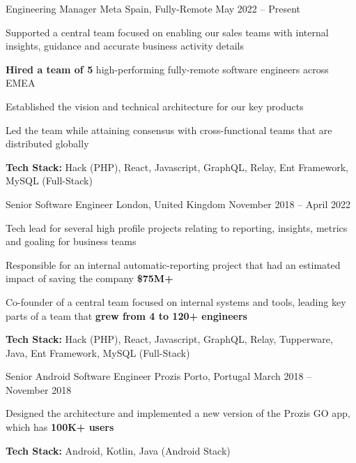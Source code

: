 \documentclass[]{awesome-cv}
\begin{document}
	
\vspace{-8mm}
\begin{cventries}

\vspace{-2mm}

\cventry
	{Engineering Manager}
	{Meta}
	{Spain, Fully-Remote}
	{May 2022 – Present}
	{\begin{cvitems}
		\item {Supported a central team focused on enabling our sales teams with internal insights, guidance and accurate business activity details}
		\item {\textbf{Hired a team of 5} high-performing fully-remote software engineers across EMEA}
		\item {Established the vision and technical architecture for our key products}
		\item {Led the team while attaining consensus with cross-functional teams that are distributed globally}
		\item {\textbf{Tech Stack:} Hack (PHP), React, Javascript, GraphQL, Relay, Ent Framework, MySQL (Full-Stack)}
	\end{cvitems}}


	\vspace{-9mm}
	\cventry
	{Senior Software Engineer}
	{}
	{London, United Kingdom}
	{November 2018 – April 2022}
	{\begin{cvitems}
		\item {Tech lead for several high profile projects relating to reporting, insights, metrics and goaling for business teams}
		\item {Responsible for an internal automatic-reporting project that had an estimated impact of saving the company  \textbf{\$75M+}}
		\item {Co-founder of a central team focused on internal systems and tools, leading key parts of a team that \textbf{grew from 4 to 120+ engineers}}
		\item {\textbf{Tech Stack:} Hack (PHP), React, Javascript, GraphQL, Relay, Tupperware, Java, Ent Framework, MySQL  (Full-Stack)}
	\end{cvitems}}

	\vspace{-4mm}
	\cventry
	{Senior Android Software Engineer}
	{Prozis}
	{Porto, Portugal}
	{March 2018 – November 2018}
	{\begin{cvitems}
		\item {Designed the architecture and implemented a new version of the Prozis GO app, which has \textbf{100K+ users}}
		\item {\textbf{Tech Stack:} Android, Kotlin, Java (Android Stack)}
	\end{cvitems}}
	


\end{cventries}
\end{document}
